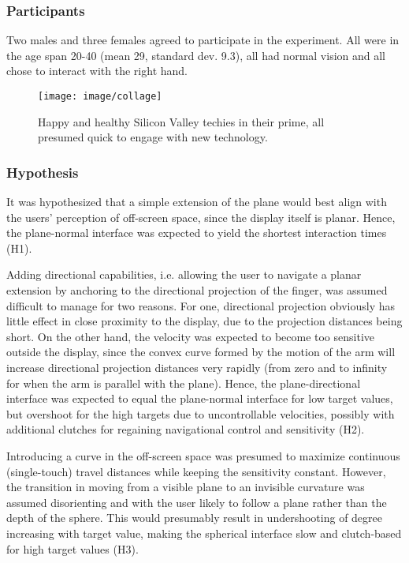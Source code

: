 
\subsubsection{Participants}

Two males and three females agreed to participate in the experiment. All were in the age span 20-40 (mean 29, standard dev. 9.3), all had normal vision and all chose to interact with the right hand.

\begin{figure}[!h]
	\centering
		\texttt{[image: image/collage]}
	\caption{Happy and healthy Silicon Valley techies in their prime, all presumed quick to engage with new technology.}
	\label{fig:collage}
\end{figure}


\subsubsection{Hypothesis}

It was hypothesized that a simple extension of the plane would best align with the users' perception of off-screen space, since the display itself is planar.  Hence, the plane-normal interface was expected to yield the shortest interaction times (H1).

Adding directional capabilities, i.e. allowing the user to navigate a planar extension by anchoring  to the directional projection of the finger, was assumed difficult to manage for two reasons. For one, directional projection obviously has little effect in close proximity to the display, due to the projection distances being short. On the other hand, the velocity was expected to become too sensitive outside the display, since the convex curve formed by the motion of the arm will increase directional projection distances very rapidly (from zero and to infinity for when the arm is parallel with the plane). Hence, the plane-directional interface was expected to equal the plane-normal interface for low target values, but overshoot for the high targets due to uncontrollable velocities, possibly with additional clutches for regaining navigational control and sensitivity (H2).  

Introducing a curve in the off-screen space was presumed to maximize continuous (single-touch) travel distances while keeping the sensitivity constant. However, the transition in moving from a visible plane to an invisible curvature was assumed disorienting  and with the user likely to follow a plane rather than the depth of the sphere. This would presumably result in undershooting of degree increasing with target value, making the spherical interface slow and clutch-based for high target values (H3).

